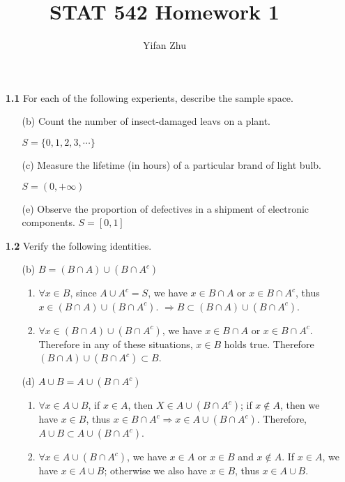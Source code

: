 \documentclass[letter]{article}
\begin{document}
	
	\title{STAT 542 Homework 1}
	\author{Yifan Zhu}
	\maketitle
	
	\begin{itemize}[leftmargin = 0 em]
	\item [\bf 1.1] For each of the following experients, describe the sample space.
	\begin{itemize}[leftmargin = 0 em]
	\item [(b)] Count the number of insect-damaged leavs on a plant.
		
		$S = \{0,1,2,3, \cdots \}$
	\item [(c)] Measure the lifetime (in hours) of a particular brand of light bulb.

	$S = (0, +\infty)$
	\item [(e)] Observe the proportion of defectives in a shipment of electronic components.
	$S = [0,1]$
 	\end{itemize}
	
	\item [\bf 1.2] Verify the following identities.
	\begin{itemize}[leftmargin = 0em] 
		\item [(b)] $B = (B \cap A) \cup (B \cap A^c)$

		\begin{enumerate}[label = (\roman*)]
			\item $\forall x \in B$, since $A\cup A^c = S$, we have $x\in B\cap A $ or $x\in B\cap A^c$, thus $x\in (B\cap A)\cup (B\cap A^c)$. $\Rightarrow B \subset (B\cap A)\cup (B\cap A^c)$.
			\item $\forall x\in (B\cap A)\cup (B\cap A^c)$, we have $x\in B\cap A$ or $x\in B\cap A^c$. Therefore in any of these situations, $x\in B$ holds true. Therefore $(B\cap A)\cup(B\cap A^c)\subset B$.
		\end{enumerate}
		
		\item [(d)] $A \cup B = A \cup (B \cap A^c)$
		\begin{enumerate}[label = (\roman*)]
			\item $\forall x\in A\cup B$, if $x\in A$, then $X\in A\cup(B\cap A^c)$; if $x\notin A$, then we have $x\in B$, thus $x\in B\cap A^c \Rightarrow x\in A\cup (B\cap A^c).$ Therefore, $A\cup B \subset A\cup (B\cap A^c)$.
			\item $\forall x\in A\cup(B\cap A^c)$, we have $x\in A$ or $x\in B$ and $x\notin A$. If $x\in A$, we have $x\in A\cup B$; otherwise we also have $x\in B$, thus $x \in A\cup B$.
		\end{enumerate}
		

\end{itemize}
\end{itemize}
\end{document}
